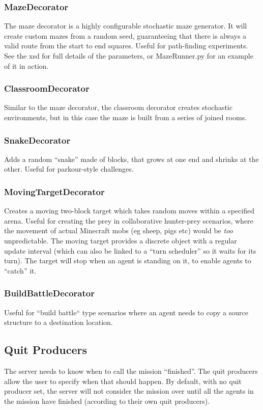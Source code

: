 \documentclass[11pt]{article} %
\begin{document}
\subsubsection{MazeDecorator}
The maze decorator is a highly configurable stochastic maze generator. It will create custom mazes from a random seed, guaranteeing that there is always a valid route from the start to end squares. Useful for path-finding experiments. See the xsd for full details of the parameters, or MazeRunner.py for an example of it in action.

\subsubsection{ClassroomDecorator}
Similar to the maze decorator, the classroom decorator creates stochastic environments, but in this case the maze is built from a series of joined rooms.

\subsubsection{SnakeDecorator}
Adds a random ``snake'' made of blocks, that grows at one end and shrinks at the other. Useful for parkour-style challenges.

\subsubsection{MovingTargetDecorator}
Creates a moving two-block target which takes random moves within a specified arena. Useful for creating the prey in collaborative hunter-prey scenarios, where the movement of actual Minecraft mobs (eg sheep, pigs etc) would be \emph{too} unpredictable. The moving target provides a discrete object with a regular update interval (which can also be linked to a ``turn scheduler'' so it waits for its turn). The target will stop when an agent is standing on it, to enable agents to ``catch'' it.

\subsubsection{BuildBattleDecorator}
Useful for ``build battle`` type scenarios where an agent needs to copy a source structure to a destination location.

\subsection{Quit Producers}
The server needs to know when to call the mission ``finished''. The quit producers allow the user to specify when that should happen. By default, with no quit producer set, the server will not consider the mission over until all the agents in the mission have finished (according to their own quit producers).
\end{document}
